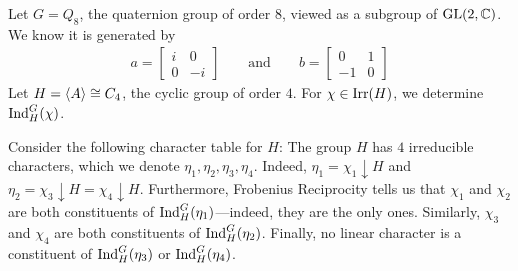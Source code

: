 
\begin{boxexample}
    Let $G = Q_8$, the quaternion group of order $8$, viewed as a subgroup of $\operatorname{GL}\!\left( 2, \mathbb{C} \right)$. We know it is generated by
    \begin{align*}
        a = \begin{bmatrix}
            i & 0 \\ 0 & -i
        \end{bmatrix}
        \quad\quad
        \text{and}
        \quad\quad
        b = \begin{bmatrix}
            0 & 1 \\ -1 & 0
        \end{bmatrix}
    \end{align*}
    Let $H = \left\langle A \right\rangle \cong C_4$, the cyclic group of order $4$. For $\chi \in \operatorname{Irr}\!\left( H \right)$, we determine $\operatorname{Ind}_H^G(\chi)$.

    Consider the following character table for $H$:
    The group $H$ has $4$ irreducible characters, which we denote $\eta_1, \eta_2, \eta_3, \eta_4$. Indeed, $\eta_1 = \chi_1 \downarrow H$ and $\eta_2 = \chi_3 \downarrow H = \chi_4 \downarrow H$. Furthermore, Frobenius Reciprocity tells us that $\chi_1$ and $\chi_2$ are both constituents of $\operatorname{Ind}_H^G(\eta_1)$---indeed, they are the only ones. Similarly, $\chi_3$ and $\chi_4$ are both constituents of $\operatorname{Ind}_H^G(\eta_2)$. Finally, no linear character is a constituent of $\operatorname{Ind}_H^G(\eta_3)$ or $\operatorname{Ind}_H^G(\eta_4)$.
\end{boxexample}